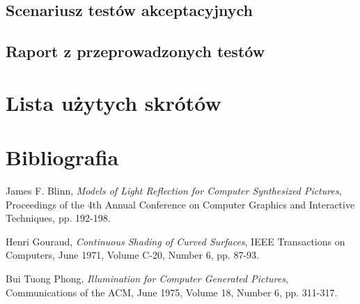 \documentclass[10pt,a4paper]{article}
\begin{document}
\subsection{Scenariusz testów akceptacyjnych}

\subsection{Raport z przeprowadzonych testów}

\section{Lista użytych skrótów}

\renewcommand*{\refname}{\vspace*{-2em}}
\section{Bibliografia}
\begin{thebibliography}{99}

	James F. Blinn,
	\emph{Models of Light Reflection for Computer Synthesized Pictures},
	Proceedings of the 4th Annual Conference on Computer Graphics and Interactive Techniques,
	pp. 192-198.
	
	Henri Gouraud,
	\emph{Continuous Shading of Curved Surfaces},
	IEEE Transactions on Computers,
	June 1971, Volume C-20, Number 6,
	pp. 87-93.

	Bui Tuong Phong,
	\emph{Illumination for Computer Generated Pictures},
	Communications of the ACM,
	June 1975, Volume 18, Number 6,
	pp. 311-317.
\end{thebibliography}
\end{document}
